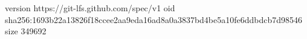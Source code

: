 version https://git-lfs.github.com/spec/v1
oid sha256:1693b22a13826f18ccee2aa9eda16ad8a0a3837bd4be5a10fe6ddbdcb7d98546
size 349692

